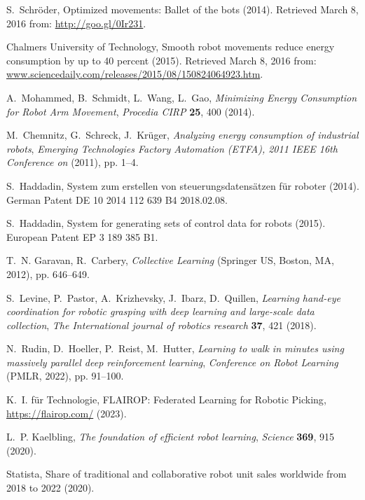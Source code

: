 \documentclass[12pt]{article}
\begin{document}
\begin{thebibliography}{10}
	S.~Schr\"oder, Optimized movements: Ballet of the bots (2014). Retrieved March
	8, 2016 from: \url{http://goo.gl/0Ir231}.
	
	{\relax Chalmers University of Technology}, Smooth robot movements reduce
	energy consumption by up to 40 percent (2015). Retrieved March 8, 2016 from:
	\url{www.sciencedaily.com/releases/2015/08/150824064923.htm}.
	
	A.~Mohammed, B.~Schmidt, L.~Wang, L.~Gao, {\it Minimizing Energy Consumption
		for Robot Arm Movement\/}, {\it Procedia CIRP\/} {\bf 25}, 400 (2014).
	
	M.~Chemnitz, G.~Schreck, J.~Krüger, {\it Analyzing energy consumption of
		industrial robots\/}, {\it Emerging Technologies Factory Automation (ETFA),
		2011 IEEE 16th Conference on\/} (2011), pp. 1--4.
	
	S.~Haddadin, System zum erstellen von steuerungsdatens\"atzen f\"ur roboter
	(2014). German Patent {DE} 10 2014 112 639 B4 2018.02.08.
	
	S.~Haddadin, System for generating sets of control data for robots (2015).
	European Patent {EP} 3 189 385 {B}1.
	
	T.~N. Garavan, R.~Carbery, {\it Collective Learning\/} (Springer US, Boston,
	MA, 2012), pp. 646--649.
	
	S.~Levine, P.~Pastor, A.~Krizhevsky, J.~Ibarz, D.~Quillen, {\it Learning
		hand-eye coordination for robotic grasping with deep learning and large-scale
		data collection\/}, {\it The International journal of robotics research\/}
	{\bf 37}, 421 (2018).
	
	N.~Rudin, D.~Hoeller, P.~Reist, M.~Hutter, {\it Learning to walk in minutes
		using massively parallel deep reinforcement learning\/}, {\it Conference on
		Robot Learning\/} (PMLR, 2022), pp. 91--100.
	
	K.~I. f\"ur Technologie, {FLAIROP: Federated Learning for Robotic Picking},
	\url{https://flairop.com/} (2023).
	
	L.~P. Kaelbling, {\it The foundation of efficient robot learning\/}, {\it
		Science\/} {\bf 369}, 915 (2020).
	
	Statista, Share of traditional and collaborative robot unit sales worldwide
	from 2018 to 2022 (2020).
	

\end{thebibliography}
\end{document}
